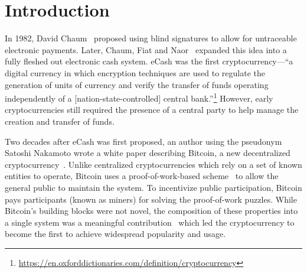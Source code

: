 
\section{Introduction}

In 1982, David Chaum~\cite{Cha82} proposed using blind signatures to allow for untraceable electronic payments.
Later, Chaum, Fiat and Naor~\cite{chaum1988untraceable} expanded this idea into a fully fleshed out electronic cash system.
eCash was the first cryptocurrency---\ie ``a digital currency in which encryption techniques are used to regulate the generation of units of currency and verify the transfer of funds operating independently of a [nation-state-controlled] central bank.''\footnote{\url{https://en.oxforddictionaries.com/definition/cryptocurrency}}
However, early cryptocurrencies still required the presence of a central party to help manage the creation and transfer of funds.

Two decades after eCash was first proposed, an author using the pseudonym Satoshi Nakamoto wrote a white paper describing Bitcoin, a new decentralized cryptocurrency~\cite{Nak08}.
Unlike centralized cryptocurrencies which rely on a set of known entities to operate, Bitcoin uses a proof-of-work-based scheme~\cite{DN93,back1997partial} to allow the general public to maintain the system.
To incentivize public participation, Bitcoin pays participants (known as miners) for solving the proof-of-work puzzles.
While Bitcoin's building blocks were not novel, the composition of these properties into a single system was a meaningful contribution~\cite{Narayanan17} which led the cryptocurrency to become the first to achieve widespread popularity and usage.


